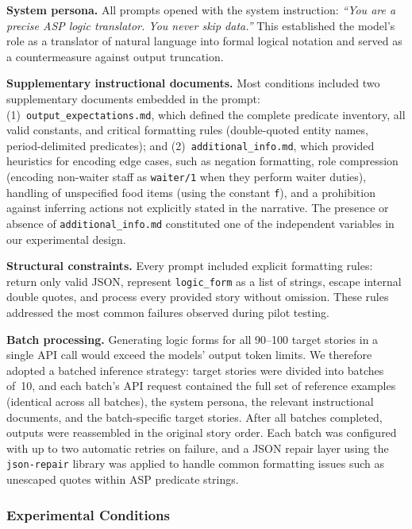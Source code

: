 \documentclass[runningheads]{llncs}
\begin{document}
\textbf{System persona.} All prompts opened with the system instruction:
\textit{``You are a precise ASP logic translator. You never skip data.''}
This established the model's role as a translator of natural language into
formal logical notation and served as a countermeasure against output
truncation.

\textbf{Supplementary instructional documents.} Most conditions included two
supplementary documents embedded in the prompt:
(1)~\texttt{output\_expectations.md}, which defined the complete predicate
inventory, all valid constants, and critical formatting rules (double-quoted
entity names, period-delimited predicates); and
(2)~\texttt{additional\_info.md}, which provided heuristics for encoding
edge cases, such as negation formatting, role compression (encoding non-waiter staff
as \texttt{waiter/1} when they perform waiter duties), handling of
unspecified food items (using the constant \texttt{f}), and a prohibition
against inferring actions not explicitly stated in the narrative.  The
presence or absence of \texttt{additional\_info.md} constituted one of the
independent variables in our experimental design.

\textbf{Structural constraints.} Every prompt included explicit formatting
rules: return only valid JSON, represent \texttt{logic\_form} as a list of
strings, escape internal double quotes, and process every provided story
without omission.  These rules addressed the most common failures observed
during pilot testing.

\textbf{Batch processing.}  Generating logic forms for all 90--100 target
stories in a single API call would exceed the models' output token limits.
We therefore adopted a batched inference strategy: target stories were divided
into batches of~10, and each batch's API request contained the full set of
reference examples (identical across all batches), the system persona, the
relevant instructional documents, and the batch-specific target stories.
After all batches completed, outputs were reassembled in the original story
order.  Each batch was configured with up to two automatic retries on failure,
and a JSON repair layer using the \texttt{json-repair} library was applied to
handle common formatting issues such as unescaped quotes within ASP predicate
strings.

\subsubsection{Experimental Conditions}
\end{document}
